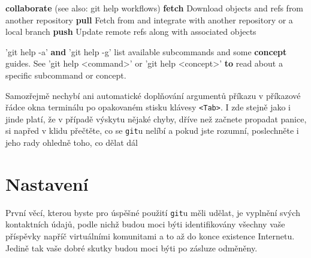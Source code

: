 \documentclass{report}
\newenvironment{Shaded}{}{}
\newcommand{\KeywordTok}[1]{\textcolor[rgb]{0.00,0.44,0.13}{\textbf{{#1}}}}
\newcommand{\StringTok}[1]{\textcolor[rgb]{0.25,0.44,0.63}{{#1}}}
\newcommand{\NormalTok}[1]{{#1}}
\begin{document}
\begin{Shaded}
\begin{Highlighting}[]
\KeywordTok{collaborate} \NormalTok{(see also: git help workflows)}
   \KeywordTok{fetch}      \NormalTok{Download objects and refs from another repository}
   \KeywordTok{pull}       \NormalTok{Fetch from and integrate with another repository or a local branch}
   \KeywordTok{push}       \NormalTok{Update remote refs along with associated objects}

\StringTok{'git help -a'} \KeywordTok{and} \StringTok{'git help -g'} \NormalTok{list available subcommands and some}
\KeywordTok{concept} \NormalTok{guides. See }\StringTok{'git help <command>'} \NormalTok{or }\StringTok{'git help <concept>'}
\KeywordTok{to} \NormalTok{read about a specific subcommand or concept.}
\end{Highlighting}
\end{Shaded}

Samozřejmě nechybí ani automatické doplňování argumentů příkazu v
příkazové řádce okna terminálu po opakovaném stisku klávesy
\texttt{\textless{}Tab\textgreater{}}. I zde stejně jako i jinde platí,
že v případě výskytu nějaké chyby, dříve než začnete propadat panice, si
napřed v klidu přečtěte, co se \texttt{git}u nelíbí a pokud jste
rozumní, poslechněte i jeho rady ohledně toho, co dělat dál

\begin{Shaded}
\end{Shaded}

    \section*{Nastavení}\label{nastavenuxed}

První věcí, kterou byste pro úspěšné použití \texttt{git}u měli udělat,
je vyplnění svých kontaktních údajů, podle nichž budou moci býti
identifikovány všechny vaše příspěvky napříč virtuálními komunitami a to
až do konce existence Internetu. Jedině tak vaše dobré skutky budou moci
býti po zásluze odměněny.

\begin{Shaded}
\end{Shaded}
\end{document}
